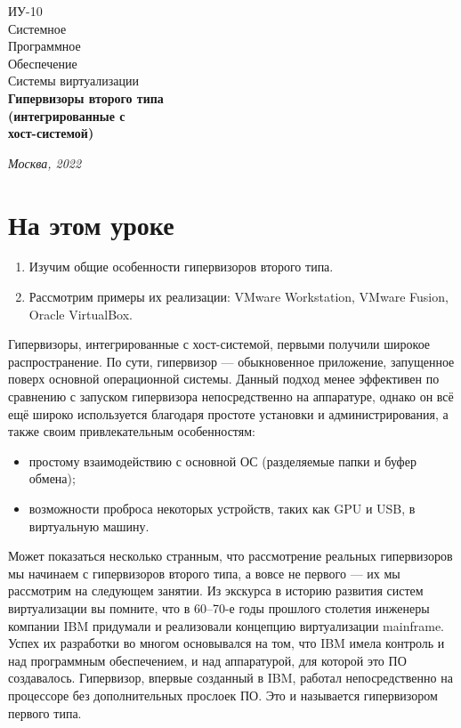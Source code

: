 \documentclass[14pt, a4paper]{article}
\begin{document}
\begin{titlepage}
    \topmargin=216pt
    \newpage
    \hangindent=0.7cm
    \huge ИУ-10\\
    Системное\\
    Программное\\
    Обеспечение\\
    Системы виртуализации\\
    \textbf{Гипервизоры второго типа\\
    (интегрированные с \\хост-системой)}

    \vspace{10cm}

    \begin{center}
        \small\textit{Москва, 2022}
    \end{center}
\end{titlepage}

\section*{На этом уроке}
\begin{enumerate}
    \item Изучим общие особенности гипервизоров второго типа.
    \item Рассмотрим примеры их реализации: VMware Workstation, VMware Fusion, Oracle VirtualBox.
\end{enumerate}

\tableofcontents
\vspace{1cm}

Гипервизоры, интегрированные с хост-системой, первыми получили широкое распространение. По
сути, гипервизор — обыкновенное приложение, запущенное поверх основной операционной системы.
Данный подход менее эффективен по сравнению с запуском гипервизора непосредственно на
аппаратуре, однако он всё ещё широко используется благодаря простоте установки и
администрирования, а также своим привлекательным особенностям:

\begin{itemize}
    \item простому взаимодействию с основной ОС (разделяемые папки и буфер обмена);
    \item возможности проброса некоторых устройств, таких как GPU и USB, в виртуальную машину.
\end{itemize}

Может показаться несколько странным, что рассмотрение реальных гипервизоров мы начинаем с
гипервизоров второго типа, а вовсе не первого — их мы рассмотрим на следующем занятии. Из
экскурса в историю развития систем виртуализации вы помните, что в 60–70-е годы прошлого
столетия инженеры компании IBM придумали и реализовали концепцию виртуализации mainframe.
Успех их разработки во многом основывался на том, что IBM имела контроль и над программным
обеспечением, и над аппаратурой, для которой это ПО создавалось. Гипервизор, впервые созданный
в IBM, работал непосредственно на процессоре без дополнительных прослоек ПО. Это и называется
гипервизором первого типа.\\
\end{document}
